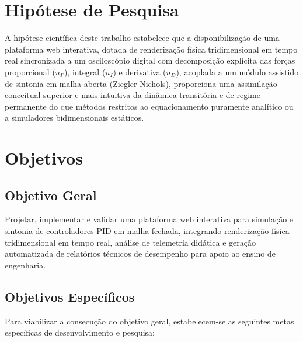 \section{Hipótese de Pesquisa}
\label{sec:hipotese}

A hipótese científica deste trabalho estabelece que a disponibilização de uma plataforma web interativa, dotada de renderização física tridimensional em tempo real sincronizada a um osciloscópio digital com decomposição explícita das forças proporcional ($u_P$), integral ($u_I$) e derivativa ($u_D$), acoplada a um módulo assistido de sintonia em malha aberta (Ziegler-Nichols), proporciona uma assimilação conceitual superior e mais intuitiva da dinâmica transitória e de regime permanente do que métodos restritos ao equacionamento puramente analítico ou a simuladores bidimensionais estáticos.

\section{Objetivos}
\label{sec:objetivos}

\subsection{Objetivo Geral}
\label{subsec:obj_geral}

Projetar, implementar e validar uma plataforma web interativa para simulação e sintonia de controladores PID em malha fechada, integrando renderização física tridimensional em tempo real, análise de telemetria didática e geração automatizada de relatórios técnicos de desempenho para apoio ao ensino de engenharia.

\subsection{Objetivos Específicos}
\label{subsec:obj_especificos}

Para viabilizar a consecução do objetivo geral, estabelecem-se as seguintes metas específicas de desenvolvimento e pesquisa:

